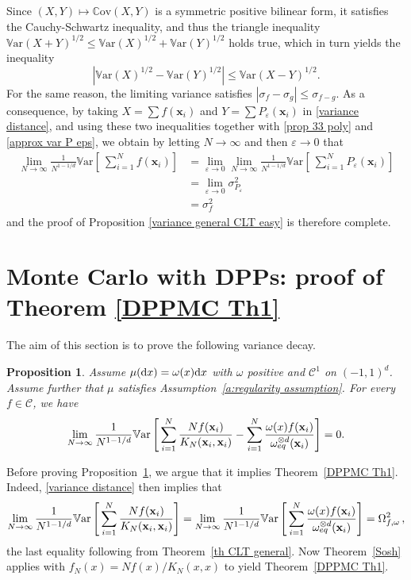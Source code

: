 \documentclass[a4paper,11pt]{article}
\numberwithin{equation}{section}
\newtheorem{proposition}[]{Proposition}
\theoremstyle{definition}
\newcommand{\eq}{\begin{equation}}
\newcommand{\qe}{\end{equation}}
\newcommand{\bv}{\mathbf}
\newcommand{\Var}{\mathbb{V}{\mathrm{ar}}}
\newcommand{\Cov}{\mathbb{C}{\mathrm{ov}}}
\renewcommand{\leq}{\leqslant}
\renewcommand{\epsilon}{\varepsilon}
\renewcommand{\d}{ {\rm d}}
\def\bx{{\bv x}}
\begin{document}
Since $(X,Y)\mapsto \Cov(X,Y)$ is a symmetric positive bilinear form, it satisfies the Cauchy-Schwartz inequality, and thus the triangle inequality $\Var(X+Y)^{1/2}\leq \Var(X)^{1/2}+\Var(Y)^{1/2}$  holds true, which in turn yields the inequality
\eq
\label{variance distance}
\left|\Var(X)^{1/2}-\Var(Y)^{1/2}\right|\leq \Var(X-Y)^{1/2}.
\qe
For the same reason, the limiting variance satisfies $\left|\sigma_f-\sigma_g\right|\leq \sigma_{f-g}$. As a consequence, by taking $X=\sum f(\bv x_i)$ and $Y=\sum P_\epsilon(\bv x_i)$ in \eqref{variance distance}, and using these two inequalities together with \eqref{prop 33 poly} and \eqref{approx var P eps}, we obtain by letting $N\to\infty$ and then $\epsilon\to0$ that
\begin{align*}
\lim_{N\to\infty}\frac{1}{N^{1-1/d}}\Var\left[\ \sum_{i=1}^N f(\bv x_i)\right]& = \lim_{\epsilon\to 0}\lim_{N\to\infty}\frac{1}{N^{1-1/d}}\Var\left[\ \sum_{i=1}^N P_\epsilon(\bv x_i)\right]\\
& = \lim_{\epsilon \to 0}\sigma^2_{P_\epsilon}\\
& = \sigma_{f}^2
\end{align*}
and the proof of Proposition \ref{variance general CLT easy} is therefore complete.







\section{Monte Carlo with DPPs: proof of Theorem \ref{DPPMC Th1}}
\label{proof th2 section}
The aim of this section is to prove the following variance decay.

\begin{proposition}
\label{key variance est}
Assume $\mu(\d x)=\omega(x)\d x$ with $\omega$ positive and
$\mathscr C^1$ on $(-1,1)^d$. Assume further that $\mu$ satisfies
Assumption~\ref{a:regularity assumption}. For every $f\in\mathscr C$, we have
\[
\lim_{N\to\infty} \frac{1}{N^{1-1/d}}\mathbb V{\rm ar}\left[\,\sum_{i=1}^N
  \frac{N f(\bx_i)}{K_N(\bx_i,\bx_i)}- \sum_{i=1}^N \frac{\omega(x)f(\bx_i)}{\omega_{eq}^{\otimes d}(\bx_i)} \right]=0.
\]
\end{proposition}
Before proving Proposition~\ref{key variance est}, we argue that it implies
Theorem~\ref{DPPMC Th1}. Indeed, \eqref{variance distance} then implies that
$$ \lim_{N\to\infty} \frac{1}{N^{1-1/d}}\mathbb V{\rm ar}\left[\,\sum_{i=1}^N
  \frac{N f(\bx_i)}{K_N(\bx_i,\bx_i)}\right] = \lim_{N\to\infty} \frac{1}{N^{1-1/d}}\mathbb V{\rm ar}\left[\,\sum_{i=1}^N \frac{\omega(x)f(\bx_i)}{\omega_{eq}^{\otimes d}(\bx_i)} \right]=\Omega_{f,\omega}^2\,,$$
the last equality following from Theorem~\ref{th CLT general}. Now
Theorem~\ref{Sosh} applies with $f_N(x) = Nf(x)/K_N(x,x)$ to yield
Theorem~\ref{DPPMC Th1}.
\end{document}

